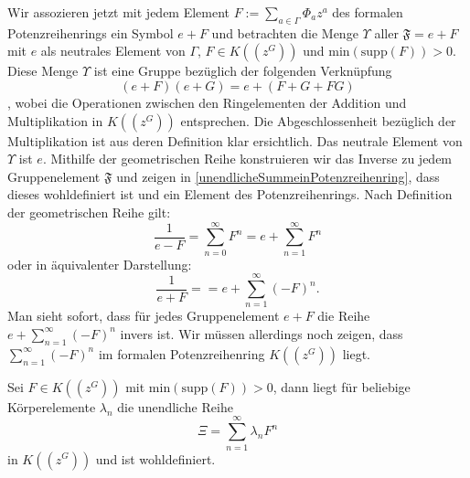 Wir assozieren jetzt mit jedem Element $F := \sum_{a \in \Gamma} \Phi_a z^a$ des formalen Potenzreihenrings ein Symbol $e+ F$ und betrachten die Menge $\Upsilon$ aller $\mathfrak{F} = e + F$ mit $e$ als neutrales Element von $\Gamma$, $F \in K\left(\left(z^{G}\right)\right)$ und $\text{min}\left(\text{supp}\left(F\right)\right) > 0$. Diese Menge $\Upsilon$ ist eine Gruppe bezüglich der folgenden Verknüpfung \[\left(e+F\right)\left(e+G\right) = e + \left(F+G+FG\right)\]
, wobei die Operationen zwischen den Ringelementen der Addition und Multiplikation in $K\left(\left(z^{G}\right)\right)$ entsprechen. Die Abgeschlossenheit bezüglich der Multiplikation ist aus deren Definition klar ersichtlich. Das neutrale Element von $\Upsilon$ ist $e$. Mithilfe der geometrischen Reihe konstruieren wir das Inverse zu jedem Gruppenelement $\mathfrak{F}$ und zeigen in \ref{unendlicheSummeinPotenzreihenring}, dass dieses wohldefiniert ist und ein Element des Potenzreihenrings. Nach Definition der geometrischen Reihe gilt:
\[\frac{1}{e - F} = \sum_{n=0}^{\infty}F^n = e + \sum_{n=1}^{\infty}F^n\] oder in äquivalenter Darstellung:
\[\frac{1}{e + F} = = e + \sum_{n=1}^{\infty}(-F)^n.\]
Man sieht sofort, dass für jedes Gruppenelement $e+ F$ die Reihe $e + \sum_{n=1}^{\infty}(-F)^n$ invers ist. Wir müssen allerdings noch zeigen, dass $\sum_{n=1}^{\infty}(-F)^n$ im formalen Potenzreihenring $K\left(\left(z^{G}\right)\right)$ liegt.
%
%
\begin{lemma}\label{unendlicheSummeinPotenzreihenring}
Sei $F\in K\left(\left(z^{G}\right)\right)$ mit $\text{min}\left(\text{supp}\left(F\right)\right) > 0$, dann liegt für beliebige Körperelemente $\lambda_n$ die unendliche Reihe
\[\Xi = \sum_{n=1}^{\infty}\lambda_nF^n\] in $K\left(\left(z^{G}\right)\right)$ und ist wohldefiniert.
\end{lemma}

